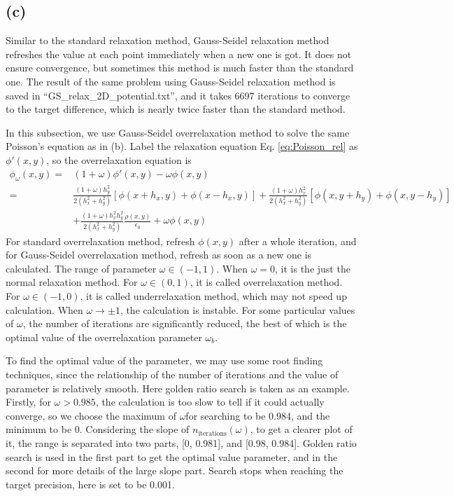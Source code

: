 \documentclass[12pt, graphicx]{article}
\begin{document}
\subsection*{(c)}
Similar to the standard relaxation method, Gauss-Seidel relaxation method refreshes the value at each point immediately when a new one is got. It does not ensure convergence, but sometimes this method is much faster than the standard one. The result of the same problem using Gauss-Seidel relaxation method is saved in \textquotedblleft GS\_relax\_2D\_potential.txt\textquotedblright, and it takes 6697 iterations to converge to the target difference, which is nearly twice faster than the standard method.\par
In this subsection, we use Gauss-Seidel overrelaxation method to solve the same Poisson's equation as in (b). Label the relaxation equation Eq. \ref{eq:Poisson_rel} as $\phi'(x,y)$, so the overrelaxation equation is 
\begin{equation}
\begin{aligned}
\phi_\omega(x,y)=&(1+\omega)\phi'(x,y)-\omega\phi(x,y)\\
=&\frac{(1+\omega)h_y^2}{2(h_x^2+h_y^2)}[\phi(x+h_x,y)+\phi(x-h_x,y)]+\frac{(1+\omega)h_x^2}{2(h_x^2+h_y^2)}[\phi(x,y+h_y)+\phi(x,y-h_y)]\\
&+\frac{(1+\omega)h_x^2h_y^2}{2(h_x^2+h_y^2)}\frac{\rho(x,y)}{\epsilon_0}+\omega\phi(x,y)
\end{aligned}
\end{equation}
For standard overrelaxation method, refresh $\phi(x,y)$ after a whole iteration, and for Gauss-Seidel overrelaxation method, refresh as soon as a new one is calculated. The range of parameter $\omega\in(-1,1)$. When $\omega=0$, it is the just the normal relaxation method. For $\omega\in(0,1)$, it is called overrelaxation method. For $\omega\in(-1,0)$, it is called underrelaxation method, which may not speed up calculation. When $\omega\to\pm1$, the calculation is instable. For some particular values of $\omega$, the number of iterations are significantly reduced, the best of which is the optimal value of the overrelaxation parameter $\omega_b$.\par
To find the optimal value of the parameter, we may use some root finding techniques, since the relationship of the number of iterations and the value of parameter is relatively smooth. Here golden ratio search is taken as an example. Firstly, for $\omega>0.985$, the calculation is too slow to tell if it could actually converge, so we choose the maximum of $\omega$for searching to be 0.984, and the minimum to be 0. Considering the slope of $n_\mathrm{iterations}(\omega)$, to get a clearer plot of it, the range is separated into two parts, [0, 0.981], and [0.98, 0.984]. Golden ratio search is used in the first part to get the optimal value parameter, and in the second for more details of the large slope part. Search stops when reaching the target precision, here is set to be 0.001.\par
\end{document}

